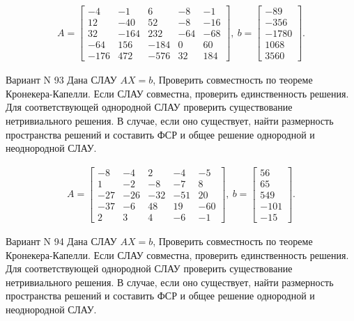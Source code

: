 \documentclass[11pt]{report}
\begin{document}
\begin{align*}
 A = \left[\begin{matrix}-4 & -1 & 6 & -8 & -1\\12 & -40 & 52 & -8 & -16\\32 & -164 & 232 & -64 & -68\\-64 & 156 & -184 & 0 & 60\\-176 & 472 & -576 & 32 & 184\end{matrix}\right],
\ b = \left[\begin{matrix}-89\\-356\\-1780\\1068\\3560\end{matrix}\right]. 
 \end{align*}

Вариант N 93
Дана СЛАУ $AX = b$,
Проверить совместность по теореме Кронекера-Капелли. Если СЛАУ совместна, проверить единственность решения.
Для соответствующей однородной СЛАУ проверить существование нетривиального решения. В случае, если оно существует,
найти размерность пространства решений и составить ФСР и общее решение однородной  и неоднородной СЛАУ.


\begin{align*}
 A = \left[\begin{matrix}-8 & -4 & 2 & -4 & -5\\1 & -2 & -8 & -7 & 8\\-27 & -26 & -32 & -51 & 20\\-37 & -6 & 48 & 19 & -60\\2 & 3 & 4 & -6 & -1\end{matrix}\right],
\ b = \left[\begin{matrix}56\\65\\549\\-101\\-15\end{matrix}\right]. 
 \end{align*}

Вариант N 94
Дана СЛАУ $AX = b$,
Проверить совместность по теореме Кронекера-Капелли. Если СЛАУ совместна, проверить единственность решения.
Для соответствующей однородной СЛАУ проверить существование нетривиального решения. В случае, если оно существует,
найти размерность пространства решений и составить ФСР и общее решение однородной  и неоднородной СЛАУ.
\end{document}
